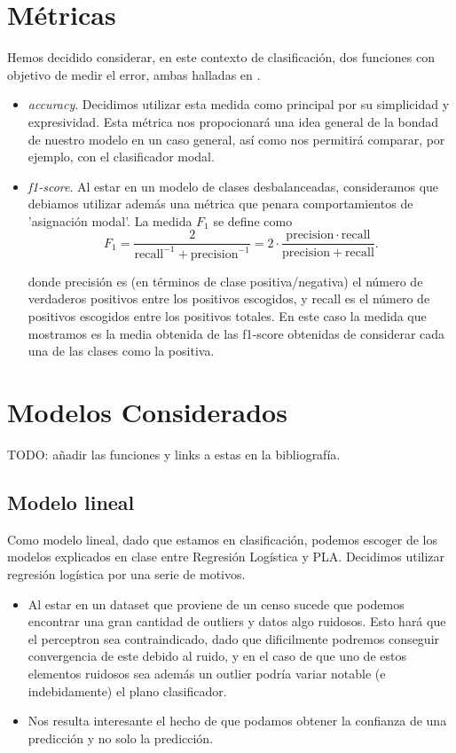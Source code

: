 \documentclass[11pt,a4paper]{article}
\begin{document}
\section{ Métricas }

Hemos decidido considerar, en este contexto de clasificación, dos funciones con objetivo de medir el error, ambas halladas en \cite{met}.
\begin{itemize}
	\item \emph{accuracy}. Decidimos utilizar esta medida como principal por su simplicidad y expresividad. Esta métrica nos propocionará una idea general de la bondad de nuestro modelo en un caso general, así como nos permitirá comparar, por ejemplo, con el clasificador modal. 
	\item \emph{f1-score}. Al estar en un modelo de clases desbalanceadas, consideramos que debiamos utilizar además una métrica que penara comportamientos de 'asignación modal'. La medida $F_1$ se define como\cite{f1}
	$${\displaystyle F_{1}={\frac {2}{\mathrm {recall} ^{-1}+\mathrm {precision} ^{-1}}}=2\cdot {\frac {\mathrm {precision} \cdot \mathrm {recall} }{\mathrm {precision} +\mathrm {recall} }}}.$$
	
	donde precisión es (en términos de clase positiva/negativa) el número de verdaderos positivos entre los positivos escogidos, y recall es el número de positivos escogidos entre los positivos totales. En este caso la medida que mostramos es la media obtenida de las f1-score obtenidas de considerar cada una de las clases como la positiva.
\end{itemize}
\section{ Modelos Considerados }
TODO: añadir las funciones y links a estas en la bibliografía.
\subsection{ Modelo lineal }
	
	Como modelo lineal, dado que estamos en clasificación, podemos escoger de los modelos explicados en clase entre Regresión Logística y  PLA. Decidimos utilizar regresión logística por una serie de motivos.
	
	\begin{itemize}
	\item Al estar en un dataset que proviene de un censo sucede que podemos encontrar una gran cantidad de outliers y datos algo ruidosos. Esto hará que el perceptron sea contraindicado, dado que dificilmente podremos conseguir convergencia de este debido al ruido, y en el caso de que uno de estos elementos ruidosos sea además un outlier podría variar notable (e indebidamente) el plano clasificador.
	\item Nos resulta interesante el hecho de que podamos obtener la confianza de una predicción y no solo la predicción.
\end{itemize}
\end{document}
